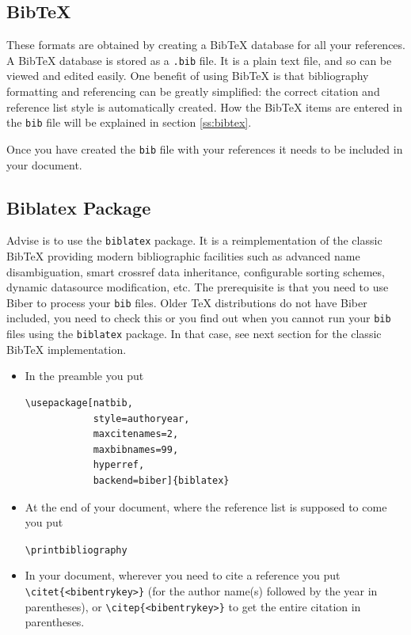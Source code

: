 \documentclass[a4paper,11pt]{article}
\theoremstyle{plain}
\theoremstyle{definition}
\begin{document}
\subsection{BibTeX}
These formats are obtained by creating a BibTeX database for all your references.
A BibTeX database is stored as a \texttt{.bib} file.
It is a plain text file, and so can be viewed and edited easily.
One benefit of using BibTeX is that bibliography formatting and
referencing can be greatly simplified: the correct citation and
reference list style is automatically created.
How the BibTeX items are entered in the \texttt{bib} file will be
explained in section \ref{ss:bibtex}.

Once you have created the
\texttt{bib} file with your references it needs to be included
in your document.

\subsection{Biblatex Package}
Advise is to use the \texttt{biblatex} package. It is a reimplementation of the
classic BibTeX providing modern bibliographic facilities such as
advanced name disambiguation, smart crossref data inheritance,
configurable sorting schemes, dynamic datasource modification, etc.
The prerequisite is that you need to use Biber to process your \texttt{bib}
files. Older TeX distributions do not have Biber included, you need to check this
or you find out when you cannot run your \texttt{bib} files using the
\texttt{biblatex} package.
In that case, see next section for the classic BibTeX implementation.

\begin{itemize}
\item
In the preamble you put

\begin{verbatim}
\usepackage[natbib,
            style=authoryear,
            maxcitenames=2,
            maxbibnames=99,
            hyperref,
            backend=biber]{biblatex}

\end{verbatim}

\item
At the end of your document, where the reference list is supposed to come you
put

\verb+\printbibliography+

\item
In your document, wherever you need
to cite a reference you put \verb+\citet{<bibentrykey>}+ (for the author name(s)
followed by the year in parentheses), or
\verb+\citep{<bibentrykey>}+
to get the entire citation in parentheses.
\end{itemize}
\end{document}
